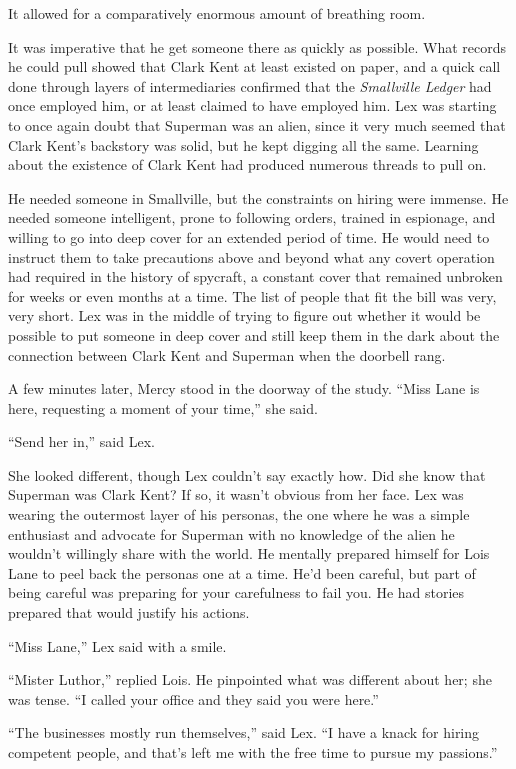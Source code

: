 It allowed for a comparatively enormous amount of breathing room.

It was imperative that he get someone there as quickly as possible. What
records he could pull showed that Clark Kent at least existed on paper,
and a quick call done through layers of intermediaries confirmed that
the \emph{Smallville Ledger} had once employed him, or at least claimed
to have employed him. Lex was starting to once again doubt that Superman
was an alien, since it very much seemed that Clark Kent's backstory was
solid, but he kept digging all the same. Learning about the existence of
Clark Kent had produced numerous threads to pull on.

He needed someone in Smallville, but the constraints on hiring were
immense. He needed someone intelligent, prone to following orders,
trained in espionage, and willing to go into deep cover for an extended
period of time. He would need to instruct them to take precautions above
and beyond what any covert operation had required in the history of
spycraft, a constant cover that remained unbroken for weeks or even
months at a time. The list of people that fit the bill was very, very
short. Lex was in the middle of trying to figure out whether it would be
possible to put someone in deep cover and still keep them in the dark
about the connection between Clark Kent and Superman when the doorbell
rang.

A few minutes later, Mercy stood in the doorway of the study. ``Miss
Lane is here, requesting a moment of your time,'' she said.

``Send her in,'' said Lex.

She looked different, though Lex couldn't say exactly how. Did she know
that Superman was Clark Kent? If so, it wasn't obvious from her face.
Lex was wearing the outermost layer of his personas, the one where he
was a simple enthusiast and advocate for Superman with no knowledge of
the alien he wouldn't willingly share with the world. He mentally
prepared himself for Lois Lane to peel back the personas one at a time.
He'd been careful, but part of being careful was preparing for your
carefulness to fail you. He had stories prepared that would justify his
actions.

``Miss Lane,'' Lex said with a smile.

``Mister Luthor,'' replied Lois. He pinpointed what was different about
her; she was tense. ``I called your office and they said you were
here.''

``The businesses mostly run themselves,'' said Lex. ``I have a knack for
hiring competent people, and that's left me with the free time to pursue
my passions.''

